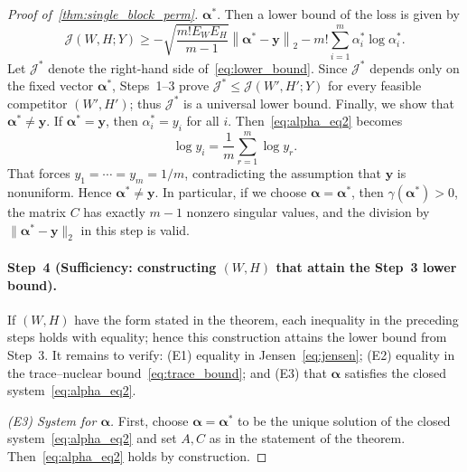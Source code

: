 \documentclass[11pt]{article}
\begin{document}
\begin{proof}[Proof of~\cref{thm:single_block_perm}]
$\boldsymbol{\alpha}^*$. Then a lower bound of the loss is given by
\begin{equation}
  \label{eq:lower_bound}
\mathcal J(W,H;Y)
\ge -\sqrt{\frac{m! E_W E_H}{ m-1 }}  \left\|\boldsymbol{\alpha}^*-\boldsymbol{y}\right\|_2
-m!\sum_{i=1}^m\alpha_i^*\log\alpha_i^*.
\end{equation}
Let \(\mathcal J^*\) denote the right-hand side of~\cref{eq:lower_bound}.  Since \(\mathcal J^*\) depends only on the fixed vector \(\boldsymbol{\alpha}^*\), Steps~1--3 prove \(\mathcal J^*\le \mathcal J(W',H';Y)\) for every feasible competitor \((W',H')\); thus \(\mathcal J^*\) is a universal lower bound. Finally, we show that \( \boldsymbol{\alpha}^* \neq \boldsymbol{y} \). If \( \boldsymbol{\alpha}^* = \boldsymbol{y} \), then \( \alpha_i^* = y_i \) for all \( i \). Then~\cref{eq:alpha_eq2} becomes
\[
\log y_i =\frac1m\sum_{r=1}^m\log y_r.
\]
That forces \(y_1=\cdots=y_m=1/m\), contradicting the assumption that \(\boldsymbol{y}\) is nonuniform. Hence \(\boldsymbol{\alpha}^*\neq\boldsymbol{y}\). In particular, if we choose \(\boldsymbol{\alpha}=\boldsymbol{\alpha}^*\), then \(\gamma(\boldsymbol{\alpha}^*)>0\), the matrix \(C\) has exactly \(m-1\) nonzero singular values, and the division by \(\|\boldsymbol{\alpha}^*-\boldsymbol{y}\|_2\) in this step is valid.

\paragraph{Step~4 (Sufficiency: constructing $(W,H)$ that attain the Step~3 lower bound).}
If $(W,H)$ have the form stated in the theorem, each inequality in the preceding steps holds with equality; hence this construction attains the lower bound from Step~3.
It remains to verify: (E1) equality in Jensen~\cref{eq:jensen}; (E2) equality in the trace--nuclear bound~\cref{eq:trace_bound}; and (E3) that $\boldsymbol{\alpha}$ satisfies the closed system~\cref{eq:alpha_eq2}.

\medskip

\noindent\textit{(E3) System for $\boldsymbol{\alpha}$.}  First, choose $\boldsymbol{\alpha}=\boldsymbol{\alpha}^*$ to be the unique solution of the closed system~\cref{eq:alpha_eq2} and set $A, C$ as in the statement of the theorem. Then~\cref{eq:alpha_eq2} holds by construction. 

\medskip


\end{proof}
\end{document}
